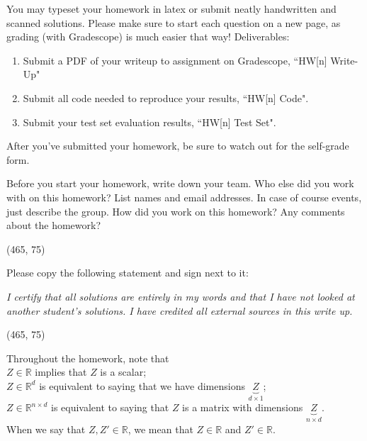 
You may typeset your homework in latex or submit neatly handwritten and scanned solutions. Please make sure to start each question on a new page, as grading (with Gradescope) is much easier that way! Deliverables:

\begin{enumerate}
  \item Submit a PDF of your writeup to assignment on Gradescope, ``HW[n] Write-Up"
  \item Submit all code needed to reproduce your results, ``HW[n] Code".
  \item Submit your test set evaluation results, ``HW[n] Test Set".
\end{enumerate}

After you've submitted your homework, be sure to watch out for the self-grade form.

\begin{Parts}

\Part Before you start your homework, write down your team. Who else did you work with on this homework? List names and email addresses. In case of course events, just describe the group. How did you work on this homework? Any comments about the homework?

\vspace{15pt}
\framebox(465, 75){}

\Part Please copy the following statement and sign next to it:

\textit{I certify that all solutions are entirely in my words and that I have not looked at another student's solutions. I have credited all external sources in this write up.}

\vspace{15pt}
\framebox(465, 75){}

\end{Parts}

\pagebreak

Throughout the homework, note that \\
$Z \in \mathbb{R}$ implies that $Z$ is a scalar; \\
$Z \in \mathbb{R}^d$ is equivalent to saying that we have dimensions $\underbrace{Z}_{d \times 1}$; \\
$Z \in \mathbb{R}^{n \times d}$ is equivalent to saying that $Z$ is a matrix with dimensions $\underbrace{Z}_{n \times d}$. \\
When we say that $Z, Z' \in \mathbb{R}$, we mean that $Z \in \mathbb{R}$ and $Z' \in \mathbb{R}$.

